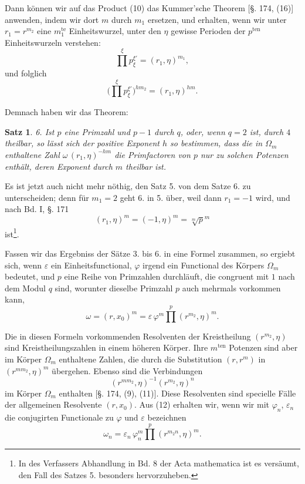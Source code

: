 \documentclass[12pt,a4paper]{article}
\newtheorem*{satz}{Satz}
\begin{document}
Dann können wir auf das Product (10) das Kummer'sche Theorem [\S. 174, (16)] anwenden, indem wir dort $m$ durch $m_1$ ersetzen, und erhalten, wenn wir unter $r_1 = r^{m_2}$ eine $m_1^{\text{te}}$ Einheitswurzel, unter den $\eta$ gewisse Perioden der $p^{\text{ten}}$ Einheitswurzeln verstehen:
\[
\prod^\xi p_\xi^{\xi'} = (r_1, \eta)^{m_1},
\]
und folglich
\begin{equation}\label{eq:181-11}
\bigl(\prod^\xi p_\xi^{\xi'}\bigr)^{hm_2} = (r_1, \eta)^{hm}.
\end{equation}

Demnach haben wir das Theorem:

\begin{satz}
6. Ist $p$ eine Primzahl und $p-1$ durch $q$, oder, wenn $q = 2$ ist, durch $4$ theilbar, so lässt sich der positive Exponent $h$ so bestimmen, dass die in $\Omega_m$ enthaltene Zahl $\omega\,(r_1, \eta)^{-hm}$ die Primfactoren von $p$ nur zu solchen Potenzen enthält, deren Exponent durch $m$ theilbar ist.
\end{satz}

Es ist jetzt auch nicht mehr nöthig, den Satz 5. von dem Satze 6. zu unterscheiden; denn für $m_1 = 2$ geht 6. in 5. über, weil dann $r_1 = -1$ wird, und nach Bd. I, \S. 171
\[
(r_1, \eta)^m = (-1, \eta)^m = \sqrt[m]{p}^m
\]
ist\footnote{In des Verfassers Abhandlung in Bd. 8 der Acta mathematica ist es versäumt, den Fall des Satzes 5. besonders hervorzuheben.}.

Fassen wir das Ergebniss der Sätze 3. bis 6. in eine Formel zusammen, so ergiebt sich, wenn $\varepsilon$ ein Einheitsfunctional, $\varphi$ irgend ein Functional des Körpers $\Omega_m$ bedeutet, und $p$ eine Reihe von Primzahlen durchläuft, die congruent mit $1$ nach dem Modul $q$ sind, worunter dieselbe Primzahl $p$ auch mehrmals vorkommen kann,
\begin{equation}\label{eq:181-12}
\omega = (r, x_0)^m = \varepsilon\,\varphi^m \prod^p (r^{m_2}, \eta)^m.
\end{equation}

Die in diesen Formeln vorkommenden Resolventen der Kreistheilung $(r^{m_2}, \eta)$ sind Kreistheilungszahlen in einem höheren Körper. Ihre $m^{\text{ten}}$ Potenzen sind aber im Körper $\Omega_m$ enthaltene Zahlen, die durch die Substitution $(r, r^m)$ in $(r^{mm_2}, \eta)^m$ übergehen. Ebenso sind die Verbindungen
\begin{equation}\label{eq:181-13}
(r^{mm_2}, \eta)^{-1}(r^{m_2}, \eta)^n
\end{equation}
im Körper $\Omega_m$ enthalten [\S. 174, (9), (11)]. Diese Resolventen sind specielle Fälle der allgemeinen Resolvente $(r, x_0)$. Aus (12) erhalten wir, wenn wir mit $\varphi_n$, $\varepsilon_n$ die conjugirten Functionale zu $\varphi$ und $\varepsilon$ bezeichnen
\begin{equation}\label{eq:181-14}
\omega_n = \varepsilon_n\,\varphi_n^m \prod^p (r^{m_2 n}, \eta)^m.
\end{equation}
\end{document}
